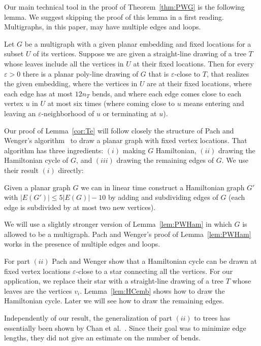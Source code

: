 \documentclass{llncs}
\begin{document}
Our main technical tool in the proof of Theorem~\ref{thm:PWG} is the following lemma. We suggest skipping the proof of this lemma in a first reading. Multigraphs, in this paper, may have multiple edges and loops.

\begin{lemma}\label{cor:Te}
Let $G$ be a multigraph with a given planar embedding and fixed locations for a subset $U$ of its vertices. Suppose we are given a straight-line drawing of a tree $T$ whose leaves include all the vertices in $U$ at their fixed locations. Then for every $\varepsilon > 0$ there is a planar poly-line drawing of $G$ that is $\varepsilon$-close to $T$, that realizes the given embedding, where the vertices in $U$ are at their fixed locations, where each edge has at most $12n_T$ bends, and where each edge comes close to each vertex $u$ in $U$ at most six times (where coming close to $u$ means entering and leaving an $\varepsilon$-neighborhood of $u$ or terminating at $u$).
\end{lemma}

Our proof of Lemma~\ref{cor:Te} will follow closely the structure of Pach and Wenger's algorithm~\cite{PW01} to draw a planar graph with fixed vertex locations. That algorithm has three ingredients: $(i)$ making $G$ Hamiltonian, $(ii)$ drawing the Hamiltonian cycle of $G$, and $(iii)$ drawing the remaining edges of $G$. We use their result $(i)$ directly:

\begin{lemma}\label{lem:PWHam}
  Given a planar graph $G$ we can in linear time construct a Hamiltonian graph $G'$ with $|E(G')| \leq 5|E(G)|-10$ by adding and subdividing edges of $G$ (each edge is subdivided by at most two new vertices). \end{lemma}

We will use a slightly stronger version of Lemma~\ref{lem:PWHam} in which $G$ is allowed to be a multigraph. Pach and Wenger's proof of Lemma~\ref{lem:PWHam} works in the presence of multiple edges and loops.

For part $(ii)$ Pach and Wenger show that a Hamiltonian cycle can be drawn at fixed vertex locations $\varepsilon$-close to a star connecting all the vertices. For our application, we replace their star with a straight-line drawing of a tree $T$ whose leaves are the vertices $v_i$. Lemma~\ref{lem:HCemb} shows how to draw the Hamiltonian cycle. Later we will see how to draw the remaining edges.

Independently of our result, the generalization of part $(ii)$ to trees has essentially been shown by Chan et al.~\cite{CHKL13}. Since their goal was to minimize edge lengths, they did not give an estimate on the number of bends.
\end{document}
